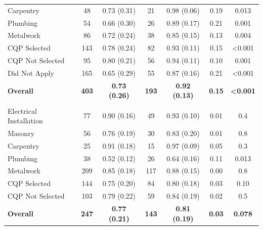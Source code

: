 \documentclass[
  a4paper, twoside, 12pt]{book}
\begin{document}
\begin{singlespacing}
\begin{table}[H]
{\begin{threeparttable}
\begin{tabular}[t]{lcccccc}
\hspace{1em}Carpentry & 48 & 0.73 (0.31) & 21 & 0.98 (0.06) & 0.19 & 0.013\\
\hspace{1em}Plumbing & 54 & 0.66 (0.30) & 26 & 0.89 (0.17) & 0.21 & 0.001\\
\hspace{1em}Metalwork & 86 & 0.72 (0.24) & 38 & 0.85 (0.15) & 0.13 & 0.004\\
\hspace{1em}CQP Selected & 143 & 0.78 (0.24) & 82 & 0.93 (0.11) & 0.15 & <0.001\\
\hspace{1em}CQP Not Selected & 95 & 0.80 (0.21) & 56 & 0.94 (0.11) & 0.10 & 0.001\\
\hspace{1em}Did Not Apply & 165 & 0.65 (0.29) & 55 & 0.87 (0.16) & 0.21 & <0.001\\
\textbf{\hspace{1em}Overall} & \textbf{403} & \textbf{0.73 (0.26)} & \textbf{193} & \textbf{0.92 (0.13)} & \textbf{0.15} & \textbf{<0.001}\\
\addlinespace[0.3em]
\multicolumn{7}{l}{\textbf{Knowledge²}}\\
\hspace{1em}Electrical Installation & 77 & 0.90 (0.16) & 49 & 0.93 (0.10) & 0.01 & 0.4\\
\hspace{1em}Masonry & 56 & 0.76 (0.19) & 30 & 0.83 (0.20) & 0.01 & 0.8\\
\hspace{1em}Carpentry & 25 & 0.91 (0.18) & 15 & 0.97 (0.09) & 0.05 & 0.3\\
\hspace{1em}Plumbing & 38 & 0.52 (0.12) & 26 & 0.64 (0.16) & 0.11 & 0.013\\
\hspace{1em}Metalwork & 209 & 0.85 (0.18) & 117 & 0.88 (0.15) & 0.00 & 0.8\\
\hspace{1em}CQP Selected & 144 & 0.75 (0.20) & 84 & 0.80 (0.18) & 0.03 & 0.10\\
\hspace{1em}CQP Not Selected & 103 & 0.79 (0.22) & 59 & 0.84 (0.19) & 0.02 & 0.5\\
\textbf{\hspace{1em}Overall} & \textbf{247} & \textbf{0.77 (0.21)} & \textbf{143} & \textbf{0.81 (0.19)} & \textbf{0.03} & \textbf{0.078}\\

\end{tabular}
\end{threeparttable}}
\end{table}
\end{singlespacing}
\end{document}
